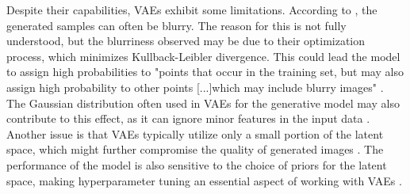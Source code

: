 Despite their capabilities, VAEs exhibit some limitations. According to \citeauthor{GoodfellowDeepLearning}, the generated samples can often be blurry. The reason for this is not fully 
understood, but the blurriness observed may be due to their optimization process, which minimizes Kullback-Leibler divergence. This could lead the model to assign high probabilities to "points that occur in the training set, but may also assign high probability to other points [...]which may include blurry images" \citep{GoodfellowDeepLearning}. The Gaussian distribution often used in VAEs for the generative model may also contribute to this effect, as it can ignore minor features in the input data \citep{GoodfellowDeepLearning}. Another issue is that VAEs typically utilize only a small portion of the latent space, which might further compromise the quality of generated images \citep{GoodfellowDeepLearning}. The performance of the model is also sensitive to the choice of priors for the latent space, making hyperparameter tuning an essential aspect of working with VAEs \citep{kingmaVAE, higginsVAE}. 

